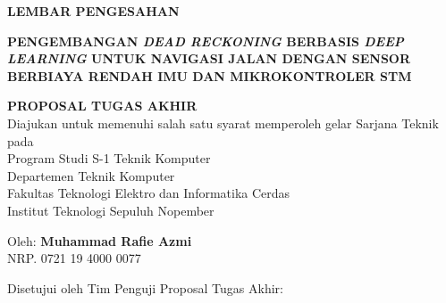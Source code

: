\begin{center}
	\large
  \textbf{LEMBAR PENGESAHAN}
\end{center}

\thispagestyle{empty}

\begin{center}
  \textbf{PENGEMBANGAN \emph{DEAD RECKONING} BERBASIS \emph{DEEP LEARNING}  
  UNTUK NAVIGASI JALAN DENGAN SENSOR BERBIAYA RENDAH IMU 
  DAN MIKROKONTROLER STM}
\end{center}

\begingroup
  \small

  \begin{center}
    \textbf{PROPOSAL TUGAS AKHIR} \\
    Diajukan untuk memenuhi salah satu syarat memperoleh gelar
    Sarjana Teknik pada \\
    Program Studi S-1 Teknik Komputer \\
    Departemen Teknik Komputer \\
    Fakultas Teknologi Elektro dan Informatika Cerdas \\
    Institut Teknologi Sepuluh Nopember \\
  \end{center}

  \begin{center}
    Oleh: \textbf{Muhammad Rafie Azmi} \\
    NRP. 0721 19 4000 0077
  \end{center}

  \begin{center}
    Disetujui oleh Tim Penguji Proposal Tugas Akhir:
  \end{center}

  \begingroup
    \setlength{\tabcolsep}{0pt}

